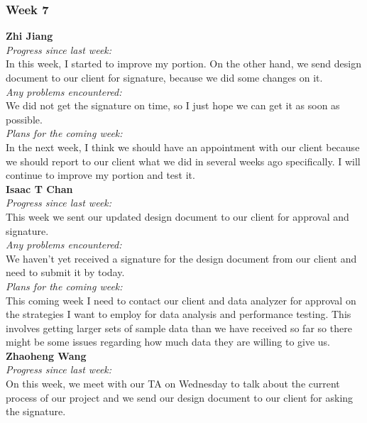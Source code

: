 \subsubsection{Week 7}
\textbf{Zhi Jiang}\\
\noindent\textit{Progress since last week:}\\
In this week, I started to improve my portion. On the other hand, we send design document to our client for signature, because we did some changes on it.\\

\noindent\textit{Any problems encountered:}\\
We did not get the signature on time, so I just hope we can get it as soon as possible.\\

\noindent\textit{Plans for the coming week:}\\
In the next week, I think we should have an appointment with our client because we should report to our client what we did in several weeks ago specifically. I will continue to improve my portion and test it.\\

\noindent\textbf{Isaac T Chan}\\
\noindent\textit{Progress since last week:}\\
This week we sent our updated design document to our client for approval and signature.\\

\noindent\textit{Any problems encountered:}\\
We haven't yet received a signature for the design document from our client and need to submit it by today.\\

\noindent\textit{Plans for the coming week:}\\
This coming week I need to contact our client and data analyzer for approval on the strategies I want to employ for data analysis and performance testing. This involves getting larger sets of sample data than we have received so far so there might be some issues regarding how much data they are willing to give us.\\

\noindent\textbf{Zhaoheng Wang}\\
\noindent\textit{Progress since last week:}\\
On this week, we meet with our TA on Wednesday to talk about the current process of our project and we send our design document to our client for asking the signature.\\

